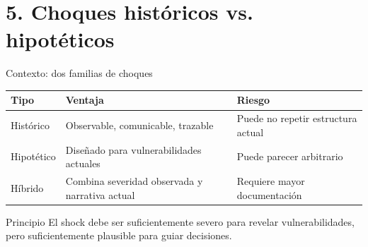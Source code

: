 \documentclass[10pt,aspectratio=169]{beamer}
\begin{document}
\section{5. Choques históricos vs. hipotéticos}

\begin{frame}{Contexto: dos familias de choques}
\begin{table}
\small
\begin{tabular}{p{3.0cm}p{4.2cm}p{4.2cm}}
\toprule
Tipo & Ventaja & Riesgo \\
\midrule
Histórico & Observable, comunicable, trazable & Puede no repetir estructura actual \\
Hipotético & Diseñado para vulnerabilidades actuales & Puede parecer arbitrario \\
Híbrido & Combina severidad observada y narrativa actual & Requiere mayor documentación \\
\bottomrule
\end{tabular}
\end{table}

\begin{block}{Principio}
El shock debe ser suficientemente severo para revelar vulnerabilidades, pero suficientemente plausible para guiar decisiones.
\end{block}
\end{frame}
\end{document}

